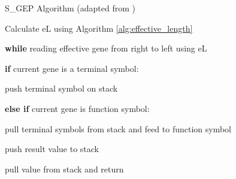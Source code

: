 \parbreak
\begin{algorithm}
	\caption{S\_GEP Algorithm (adapted from \cite{peng2014improved})}\label{alg:gep_stack}
	\begin{algorithmic}[1]
	\item Calculate eL using Algorithm \ref{alg:effective_length}
	\item \textbf{while} reading effective gene from right to left using eL
	\item \quad \textbf{if} current gene is a terminal symbol:
	\item \quad \quad push terminal symbol on stack
	\item \quad \textbf{else if} current gene is function symbol:
	\item \quad \quad pull terminal symbols from stack and feed to function symbol
	\item \quad \quad push result value to stack
	\item pull value from stack and return
\end{algorithmic}
\end{algorithm}